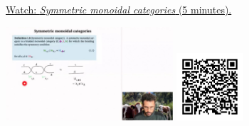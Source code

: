 
\begin{minipage}{10cm}
    \href{https://act4e-spring21.netlify.app/videos/spring2021-par-feedback:symmetric-moncat.html}{Watch: \emph{Symmetric monoidal categories} (5 minutes).}
        
    \href{https://act4e-spring21.netlify.app/videos/spring2021-par-feedback:symmetric-moncat.html}{\includegraphics[height=3.5cm]{spring2021-par-feedback:symmetric-moncat/thumbnails.jpg}}
    \href{https://act4e-spring21.netlify.app/videos/spring2021-par-feedback:symmetric-moncat.html}{\includegraphics[height=2.5cm]{spring2021-par-feedback:symmetric-moncat/qrcode.png}}
\end{minipage}
